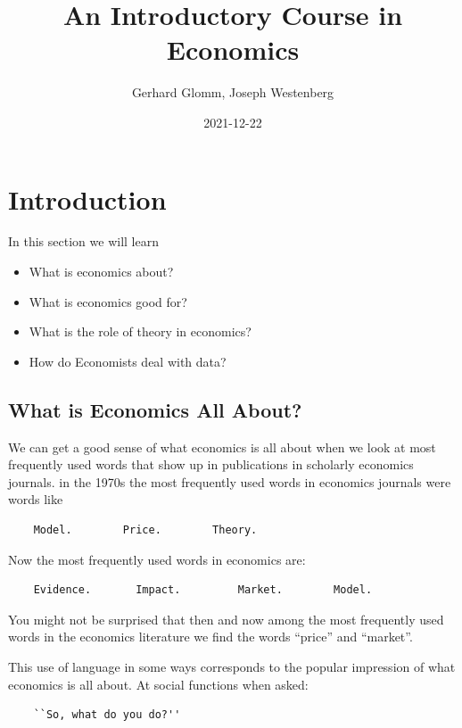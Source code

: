 \documentclass[
]{book}
\title{An Introductory Course in Economics}
\author{Gerhard Glomm, Joseph Westenberg}
\date{2021-12-22}
\providecommand{\tightlist}{%
  \setlength{\itemsep}{0pt}\setlength{\parskip}{0pt}}
\begin{document}
\maketitle

{
\setcounter{tocdepth}{1}
\tableofcontents
}
\hypertarget{intro}{%
\chapter{Introduction}\label{intro}}

In this section we will learn

\begin{itemize}
\tightlist
\item
  What is economics about?
\item
  What is economics good for?
\item
  What is the role of theory in economics?
\item
  How do Economists deal with data?
\end{itemize}

\hypertarget{what-is-economics-all-about}{%
\section{What is Economics All About?}\label{what-is-economics-all-about}}

We can get a good sense of what economics is all about when we look at most frequently used words that show up in publications in scholarly economics journals. in the 1970s the most frequently used words in economics journals were words like

\begin{verbatim}
    Model.        Price.        Theory.
\end{verbatim}

Now the most frequently used words in economics are:

\begin{verbatim}
    Evidence.       Impact.         Market.        Model.
\end{verbatim}

You might not be surprised that then and now among the most frequently used words in the economics literature we find the words ``price'' and ``market''.

This use of language in some ways corresponds to the popular impression of what economics is all about. At social functions when asked:

\begin{verbatim}
    ``So, what do you do?''
\end{verbatim}
\end{document}
